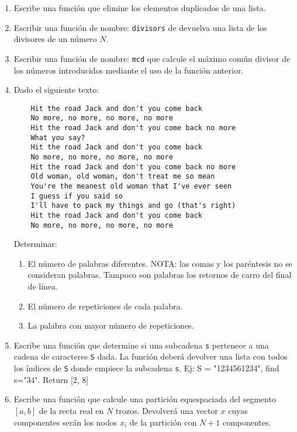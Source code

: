 \documentclass[12pt]{article}
\begin{document}
\begin{enumerate}
\item Escribe una función que elimine los elementos duplicados de una lista. 

\item Escribir una función de nombre: \texttt{divisors} de devuelva una lista de los divisores de un número $N$.  

\item Escribir una función de nombre: \texttt{mcd} que calcule el máximo común divisor de los números introducidos
mediante el uso de la función anterior. 



\newpage 


\item Dado el siguiente texto: 
\begin{verbatim}
	Hit the road Jack and don't you come back
	No more, no more, no more, no more
	Hit the road Jack and don't you come back no more
	What you say?
	Hit the road Jack and don't you come back
	No more, no more, no more, no more
	Hit the road Jack and don't you come back no more
	Old woman, old woman, don't treat me so mean
	You're the meanest old woman that I've ever seen
	I guess if you said so
	I'll have to pack my things and go (that's right)
	Hit the road Jack and don't you come back
	No more, no more, no more, no more	
\end{verbatim}
Determinar: 
\begin{enumerate} 
\item  El número de palabras diferentes. NOTA: las comas y los paréntesis
 no se consideran palabras. 
Tampoco son palabras los retornos de carro del final de línea.
\item  El número de repeticiones de cada palabra.
\item  La palabra con mayor número de repeticiones. 
\end{enumerate} 


\item Escribe una función que determine si una subcadena \texttt{s} pertenece a una cadena de 
caracteres \texttt{S} dada.
La función deberá devolver una lista con todos los índices de \texttt{S} donde empiece la subcadena \texttt{s}.
Ej: S = "1234561234", find s="34". Return [2, 8]



\newpage 

\item Escribe una función que calcule una partición equespaciada del 
segmento $ [a, b] $ de la recta real en $ N  $ trozos. 
Devolverá una  vector $x$ cuyas componentes serán los nodos $ x_i $ de la partición
con $ N+1 $ componentes.  





\end{enumerate}
\end{document}
